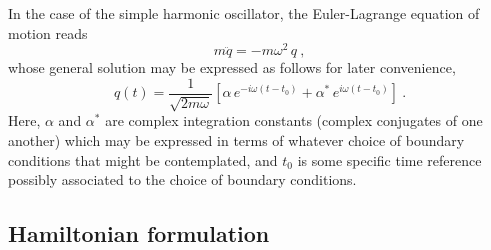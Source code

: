 \documentclass[a4paper,11pt]{article}
\begin{document}
In the case of the simple harmonic oscillator, the Euler-Lagrange equation
of motion reads
\begin{equation}
m\ddot{q}=-m\omega^2\,q\ ,
\end{equation}
whose general solution may be expressed as follows for later
convenience,
\begin{equation}
q(t)=\frac{1}{\sqrt{2m\omega}}
\left[\alpha\,e^{-i\omega(t-t_0)}+\alpha^*\,e^{i\omega(t-t_0)}\right]\ .
\end{equation}
Here, $\alpha$ and $\alpha^*$ are complex integration constants (complex
conjugates of one another) which may be expressed in terms of whatever
choice of boundary conditions that might be contemplated, and $t_0$
is some specific time reference possibly associated to the choice of
boundary conditions.

\subsection{Hamiltonian formulation}
\label{Subsect2.2}
\end{document}
